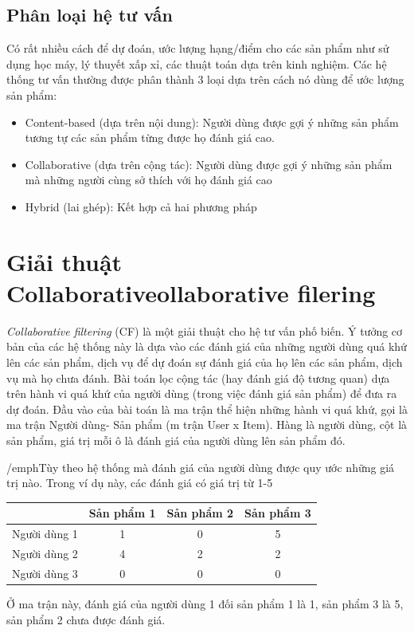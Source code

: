 \documentclass{report}
\begin{document}
\subsection{Phân loại hệ tư vấn}
Có rất nhiều cách để dự đoán, ước lượng hạng/điểm cho các sản phẩm như sử dụng học máy, lý thuyết xấp xỉ, các thuật toán dựa trên kinh nghiệm. Các hệ thống tư vấn thường được phân thành 3 loại dựa trên cách nó dùng để ước lượng sản phẩm:
\begin{itemize}
	\item Content-based (dựa trên nội dung): Người dùng được gợi ý những sản phẩm tương tự các sản phẩm từng được họ đánh giá cao.
	\item Collaborative (dựa trên cộng tác): Người dùng được gợi ý những sản phẩm mà những người cùng sở thích với họ đánh giá cao
	\item Hybrid (lai ghép): Kết hợp cả hai phương pháp
\end{itemize}

\section{Giải thuật Collaborativeollaborative filering}
\emph{Collaborative filtering} (CF) là một giải thuật cho hệ tư vấn phố biến.
Ý tưởng cơ bản của các hệ thống này là dựa vào các đánh giá của những người dùng quá khứ lên các sản phẩm, dịch vụ để dự đoán sự đánh giá của họ lên các sản phẩm, dịch vụ mà họ chưa đánh.
Bài toán lọc cộng tác (hay đánh giá độ tương quan) dựa trên hành vi quá khứ của người dùng (trong việc đánh giá sản phẩm) để đưa ra dự đoán.
Đầu vào của bài toán là ma trận thể hiện những hành vi quá khứ, gọi là ma trận Người dùng- Sản phẩm (m trận User x Item). Hàng là người dùng, cột là sản phẩm, giá trị mỗi ô là đánh giá của người dùng lên sản phẩm đó.

/emph{Tùy theo hệ thống mà đánh giá của người dùng được quy ước những giá trị nào. Trong ví dụ này, các đánh giá có giá trị từ 1-5}

\begin{tabular}{|c|c|c|c|}
	\hline  & Sản phẩm 1 & Sản phẩm 2 & Sản phẩm 3 \\ 
	\hline Người dùng 1 & 1 &  0& 5 \\ 
	\hline Người dùng 2 & 4 & 2 & 2 \\ 
	\hline  Người dùng 3 &  0& 0 & 0  \\ 
	\hline 
\end{tabular} 

Ở ma trận này, đánh giá của người dùng 1 đối sản phẩm 1 là 1, sản phẩm 3 là 5,
sản phẩm 2 chưa được đánh giá.
\end{document}

